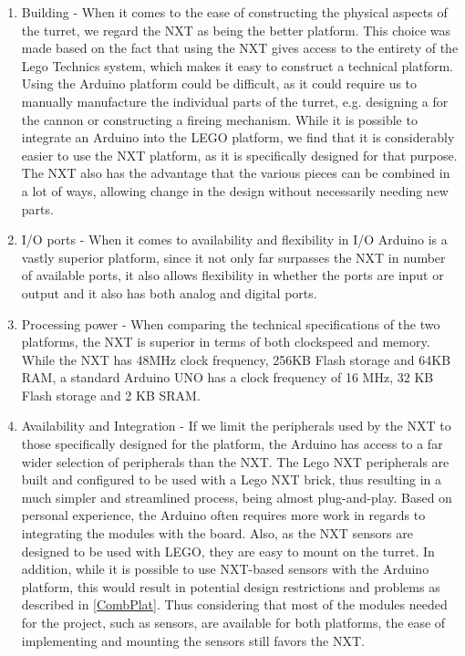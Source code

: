 \begin{enumerate}
  \item Building - When it comes to the ease of constructing the physical
  aspects of the turret, we regard the NXT as being the better platform. This
  choice was made based on the fact that using the NXT gives access to the
  entirety of the Lego Technics system, which makes it easy to construct a
  technical platform. Using the Arduino platform could be difficult, as it could
  require us to manually manufacture the individual parts of the turret, e.g.
  designing a  for the cannon or constructing a fireing
  mechanism.
  While it is possible to integrate an Arduino into the LEGO platform, we find
  that it is considerably easier to use the NXT platform, as it is specifically
  designed for that purpose. The NXT also has the advantage that the various
  pieces can be combined in a lot of ways, allowing change in the design without
  necessarily needing new parts.

  \item I/O ports - When it comes to availability and flexibility in I/O
  Arduino is a vastly superior platform, since it not only far surpasses the NXT
  in number of available ports, it also allows flexibility in whether the ports
  are input or output and it also has both analog and digital ports.
  
  \item Processing power - When comparing the technical specifications of the
  two platforms, the NXT is superior in terms of both clockspeed and memory.
  While the NXT has 48MHz clock frequency, 256KB Flash storage and 64KB RAM, a
  standard Arduino UNO has a clock frequency of 16 MHz, 32 KB Flash storage and
  2 KB SRAM.
  
  \item Availability and Integration - If we limit the peripherals used by the
  NXT to those specifically designed for the platform, the Arduino has access
  to a far wider selection of peripherals than the NXT. The Lego NXT
  peripherals are built and configured to be used with a Lego NXT brick, thus
  resulting in a much simpler and streamlined process, being almost
  plug-and-play. Based on personal experience, the Arduino often requires more
  work in regards to integrating the modules with the board. Also, as the NXT
  sensors are designed to be used with LEGO, they are easy to mount on the
  turret. In addition, while it is possible to use NXT-based sensors with the
  Arduino platform, this would result in potential design restrictions and
  problems as described in \autoref{CombPlat}. Thus considering that most of
  the modules needed for the project, such as sensors, are available for both
  platforms, the ease of implementing and mounting the sensors still favors the
  NXT.
\end{enumerate}

